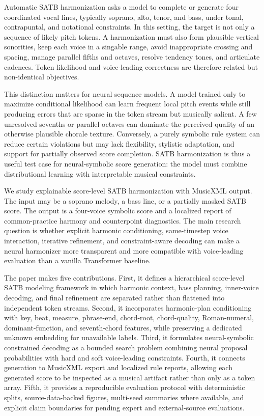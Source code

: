 \documentclass[11pt]{article}
\begin{document}
Automatic SATB harmonization asks a model to complete or generate four coordinated vocal lines, typically soprano, alto, tenor, and bass, under tonal, contrapuntal, and notational constraints. In this setting, the target is not only a sequence of likely pitch tokens. A harmonization must also form plausible vertical sonorities, keep each voice in a singable range, avoid inappropriate crossing and spacing, manage parallel fifths and octaves, resolve tendency tones, and articulate cadences. Token likelihood and voice-leading correctness are therefore related but non-identical objectives.

This distinction matters for neural sequence models. A model trained only to maximize conditional likelihood can learn frequent local pitch events while still producing errors that are sparse in the token stream but musically salient. A few unresolved sevenths or parallel octaves can dominate the perceived quality of an otherwise plausible chorale texture. Conversely, a purely symbolic rule system can reduce certain violations but may lack flexibility, stylistic adaptation, and support for partially observed score completion. SATB harmonization is thus a useful test case for neural-symbolic score generation: the model must combine distributional learning with interpretable musical constraints.

We study explainable score-level SATB harmonization with MusicXML output. The input may be a soprano melody, a bass line, or a partially masked SATB score. The output is a four-voice symbolic score and a localized report of common-practice harmony and counterpoint diagnostics. The main research question is whether explicit harmonic conditioning, same-timestep voice interaction, iterative refinement, and constraint-aware decoding can make a neural harmonizer more transparent and more compatible with voice-leading evaluation than a vanilla Transformer baseline.

The paper makes five contributions. First, it defines a hierarchical score-level SATB modeling framework in which harmonic context, bass planning, inner-voice decoding, and final refinement are separated rather than flattened into independent token streams. Second, it incorporates harmonic-plan conditioning with key, beat, measure, phrase-end, chord-root, chord-quality, Roman-numeral, dominant-function, and seventh-chord features, while preserving a dedicated unknown embedding for unavailable labels. Third, it formulates neural-symbolic constrained decoding as a bounded search problem combining neural proposal probabilities with hard and soft voice-leading constraints. Fourth, it connects generation to MusicXML export and localized rule reports, allowing each generated score to be inspected as a musical artifact rather than only as a token array. Fifth, it provides a reproducible evaluation protocol with deterministic splits, source-data-backed figures, multi-seed summaries where available, and explicit claim boundaries for pending expert and external-source evaluations.
\end{document}

